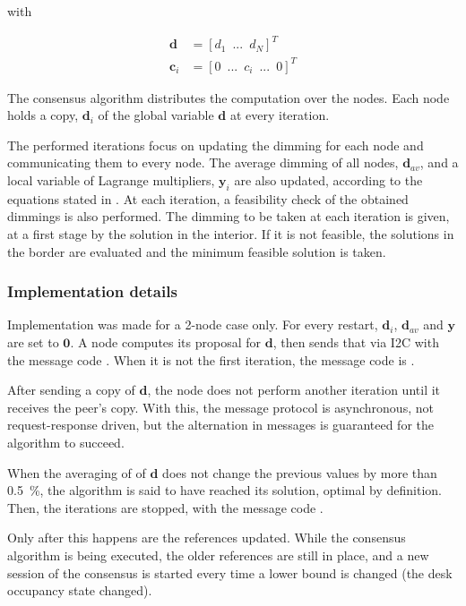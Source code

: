 \documentclass[english,fira]{ist-report}
\begin{document}
with

\begin{align*}
    \textbf{d} & = [d_1 \enspace ... \enspace d_N]^T \\
    \textbf{c}_i & = [0 \enspace ... \enspace c_i \enspace ... \enspace 0]^T
\end{align*}

The consensus algorithm distributes the computation over the nodes. Each node holds a copy, $\textbf{d}_i$ of the global variable $\textbf{d}$ at every iteration.

The performed iterations focus on updating the dimming for each node and communicating them to every node. The average dimming of all nodes, $\textbf{d}_{av}$, and a local variable of Lagrange multipliers, $\textbf{y}_i$ are also updated, according to the equations stated in \cite{consensusbernardino}. 
At each iteration, a feasibility check of the obtained dimmings is also performed. The dimming to be taken at each iteration is given, at a first stage by the solution in the interior. If it is not feasible, the solutions in the border are evaluated and the minimum feasible solution is taken.

\subsubsection{Implementation details}

Implementation was made for a 2-node case only. For every restart, $\textbf{d}_i$, $\textbf{d}_{av}$ and $\textbf{y}$ are set to $\textbf{0}$. A node computes its proposal for $\textbf{d}$, then sends that via I2C with the message code . When it is not the first iteration, the message code is . 

After sending a copy of $\textbf{d}$, the node does not perform another iteration until it receives the peer's copy. With this, the message protocol is asynchronous, not request-response driven, but the alternation in messages is guaranteed for the algorithm to succeed. 

When the averaging of of $\textbf{d}$ does not change the previous values by more than \SI{0.5}{\percent}, the algorithm is said to have reached its solution, optimal by definition. Then, the iterations are stopped, with the message code .

Only after this happens are the references updated. While the consensus algorithm is being executed, the older references are still in place, and a new session of the consensus is started every time a lower bound is changed (the desk occupancy state changed).
\end{document}
